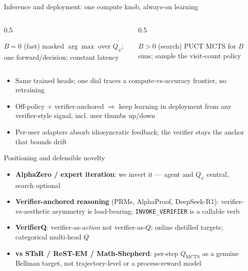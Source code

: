 \documentclass[aspectratio=169]{beamer}
\newcommand{\Qpsi}{Q_\psi}
\newcommand{\QMCTS}{Q_{\mathrm{MCTS}}}
\newcommand{\verbword}[1]{\texttt{#1}}
\begin{document}
\begin{frame}{Inference and deployment: one compute knob, always-on learning}
  \begin{columns}[T]
    \begin{column}{0.5\textwidth}
      \begin{block}{$B=0$ (fast)} masked $\arg\max$ over $\Qpsi$; one forward/decision; constant latency \end{block}
    \end{column}
    \begin{column}{0.5\textwidth}
      \begin{block}{$B>0$ (search)} PUCT MCTS for $B$ sims; sample the visit-count policy \end{block}
    \end{column}
  \end{columns}
  \begin{itemize}
    \item Same trained heads; one dial traces a compute-vs-accuracy frontier, no retraining
    \item Off-policy $+$ verifier-anchored $\Rightarrow$ keep learning in deployment from any verifier-style signal, incl. \alert{user thumbs up/down}
    \item Per-user adapters absorb idiosyncratic feedback; the verifier stays the anchor that bounds drift
  \end{itemize}
\end{frame}

\begin{frame}{Positioning and defensible novelty}
  \begin{itemize}
    \item \textbf{AlphaZero / expert iteration}: we \alert{invert} it --- agent and $\Qpsi$ central, search optional
    \item \textbf{Verifier-anchored reasoning} (PRMs, AlphaProof, DeepSeek-R1): verifier-vs-aesthetic asymmetry is load-bearing; \verbword{INVOKE\_VERIFIER} is a callable verb
    \item \textbf{VerifierQ}: verifier-as-\emph{action} not verifier-as-$Q$; online distilled targets; categorical multi-head $Q$
    \item \textbf{vs STaR / ReST-EM / Math-Shepherd}: per-step $\QMCTS$ as a genuine Bellman target, not trajectory-level or a process-reward model
  \end{itemize}
\end{frame}
\end{document}

